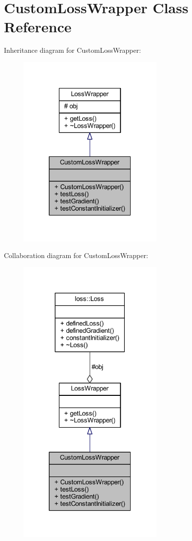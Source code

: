 \hypertarget{class_custom_loss_wrapper}{}\section{Custom\+Loss\+Wrapper Class Reference}
\label{class_custom_loss_wrapper}


Inheritance diagram for Custom\+Loss\+Wrapper\+:\nopagebreak
\begin{figure}[H]
\begin{center}
\leavevmode
\includegraphics[width=205pt]{class_custom_loss_wrapper__inherit__graph}
\end{center}
\end{figure}


Collaboration diagram for Custom\+Loss\+Wrapper\+:\nopagebreak
\begin{figure}[H]
\begin{center}
\leavevmode
\includegraphics[width=205pt]{class_custom_loss_wrapper__coll__graph}
\end{center}
\end{figure}
